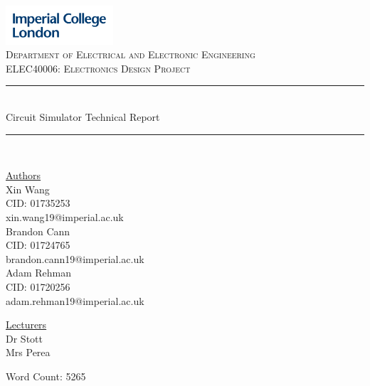 \documentclass[12pt,a4paper]{article}
\begin{document}
\begin{titlepage}
	\newcommand{\HRule}{\rule{\linewidth}{0.5mm}}
    \includegraphics[width = 4cm]{./Images/Logo.jpg}\\[0.5cm] 
    
    \center 
	\textsc{\large Department of Electrical and Electronic Engineering }\\[0.5cm] 
	\textsc{\normalsize ELEC40006: Electronics Design Project}\\[0.5cm] 
    
	\HRule \\[0.4cm]
	Circuit Simulator Technical Report
    \HRule \\[1.5cm]
     
    \begin{center}
		\underline{Authors}\\[0.5cm] Xin Wang\\CID: 01735253\\xin.wang19@imperial.ac.uk\\[0.5cm]
		Brandon Cann\\ CID: 01724765\\ brandon.cann19@imperial.ac.uk\\[0.5cm]
		Adam Rehman\\ CID: 01720256\\adam.rehman19@imperial.ac.uk\\[1.5cm]
	\end{center} \large
	
    \begin{center}
		\underline{Lecturers}\\[0.5cm] Dr Stott\\Mrs Perea\\[0.5cm]
	\end{center} \large

    \vfill %
 	\small Word Count: 5265 \\ [0.5cm]
    \makeatletter
    \@date 
    \makeatother
\end{titlepage}

\tableofcontents
\pagebreak
\end{document}
